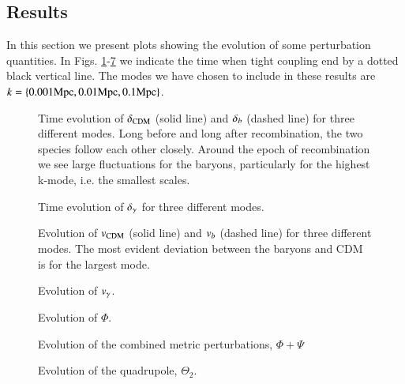 \subsection{Results}\label{ssec:M3:results}
In this section we present plots showing the evolution of some perturbation quantities. In Figs. \ref{fig:M3:results:deltas}-\ref{fig:M3:results:Theta2} we indicate the time when tight coupling end by a dotted black vertical line. The modes we have chosen to include in these results are $k=\{ 0.001\mathrm{Mpc},0.01\mathrm{Mpc},0.1\mathrm{Mpc} \}$.

\begin{figure}[ht!]
    \caption{Time evolution of $\delta_\mathrm{CDM}$ (solid line) and $\delta_b$ (dashed line) for three different modes. Long before and long after recombination, the two species follow each other closely. Around the epoch of recombination we see large fluctuations for the baryons, particularly for the highest k-mode, i.e. the smallest scales.}
    \label{fig:M3:results:deltas}
\end{figure}

\begin{figure}[ht!]
    \caption{Time evolution of $\delta_\gamma$ for three different modes. }
    \label{fig:M3:results:delta_gamma}
\end{figure}


\begin{figure}[ht!]
    \caption{Evolution of $v_\mathrm{CDM}$ (solid line) and $v_b$ (dashed line) for three different modes. The most evident deviation between the baryons and CDM is for the largest mode.}
    \label{fig:M3:results:vels}
\end{figure}

\begin{figure}[ht!]
    \caption{Evolution of $v_\gamma$.}
    \label{fig:M3:results:v_gamma}
\end{figure}



\begin{figure}[ht!]
    \caption{Evolution of $\Phi$.}
    \label{fig:M3:results:Phi}
\end{figure}



\begin{figure}[ht!]
    \caption{Evolution of the combined metric perturbations, $\Phi+\Psi$}
    \label{fig:M3:results:Phi_plus_Psi}
\end{figure}



\begin{figure}[ht!]
    \caption{Evolution of the quadrupole, $\Theta_2$.}
    \label{fig:M3:results:Theta2}
\end{figure}
